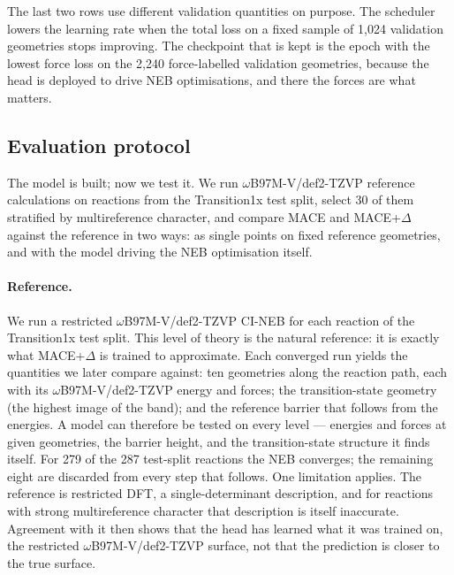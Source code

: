 The last two rows use different validation quantities on purpose. The
scheduler lowers the learning rate when the total loss on a fixed
sample of 1{,}024 validation geometries stops improving. The
checkpoint that is kept is the epoch with the lowest force loss on
the 2{,}240 force-labelled validation geometries, because the head is
deployed to drive NEB optimisations, and there the forces are what
matters.


\subsection{Evaluation protocol}
\label{sec:delta-protocol}

The model is built; now we test it. We run $\omega$B97M-V/def2-TZVP reference
calculations on reactions from the Transition1x test split, select 30 of
them stratified by multireference character, and compare MACE and
MACE+$\Delta$ against the reference in two ways: as single points on fixed
reference geometries, and with the model driving the NEB optimisation
itself.

\paragraph{Reference.}
We run a restricted $\omega$B97M-V/def2-TZVP CI-NEB for each reaction of the Transition1x
test split. This level of theory is the natural reference: it is exactly
what MACE+$\Delta$ is trained to approximate. Each converged run yields the
quantities we later compare against: ten geometries along the reaction path,
each with its $\omega$B97M-V/def2-TZVP energy and forces; the transition-state geometry (the
highest image of the band); and the reference barrier that follows from the
energies. A model can therefore be tested on every level --- energies and
forces at given geometries, the barrier height, and the transition-state
structure it finds itself. For 279 of the 287 test-split reactions the NEB
converges; the remaining eight are discarded from every step that follows.
One limitation applies. The reference is restricted DFT, a
single-determinant description, and for reactions with strong
multireference character that description is itself inaccurate.
Agreement with it then shows that the head has learned what it was
trained on, the restricted $\omega$B97M-V/def2-TZVP surface, not that
the prediction is closer to the true surface.

